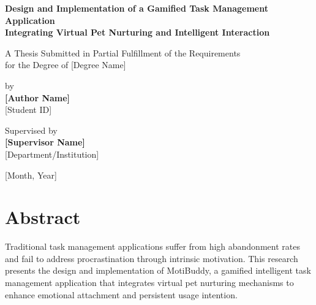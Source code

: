 \documentclass[12pt,a4paper]{report}
\begin{document}
\begin{titlepage}
    \centering
    \vspace*{2cm}
    
    {\LARGE\bfseries Design and Implementation of a Gamified Task Management Application\\[0.3cm]
    Integrating Virtual Pet Nurturing and Intelligent Interaction\par}
    
    \vspace{2cm}
    
    {\Large A Thesis Submitted in Partial Fulfillment of the Requirements\\[0.3cm]
    for the Degree of [Degree Name]\par}
    
    \vspace{2cm}
    
    {\large by\\[0.5cm]
    \textbf{[Author Name]}\\[0.3cm]
    [Student ID]\par}
    
    \vspace{2cm}
    
    {\large Supervised by\\[0.3cm]
    \textbf{[Supervisor Name]}\\[0.3cm]
    [Department/Institution]\par}
    
    \vfill
    
    {\large [Month, Year]\par}
    
\end{titlepage}

\chapter*{Abstract}

Traditional task management applications suffer from high abandonment rates and fail to address procrastination through intrinsic motivation. This research presents the design and implementation of MotiBuddy, a gamified intelligent task management application that integrates virtual pet nurturing mechanisms to enhance emotional attachment and persistent usage intention.
\end{document}

